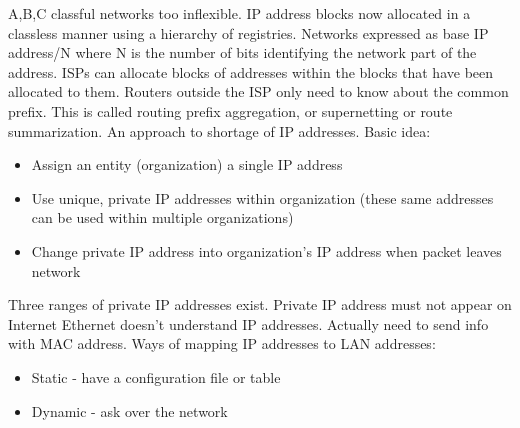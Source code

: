 \documentclass[number]{notes}
\begin{document}
\begin{landscape}
\begin{multicols}{3}
A,B,C classful networks too inflexible. IP address blocks now allocated in a classless manner using a hierarchy of registries. Networks expressed as base IP address/N where N is the number of bits identifying the network part of the address.
ISPs can allocate blocks of addresses within the blocks that have been allocated to them. Routers outside the ISP only need to know about the common prefix. This is called routing prefix aggregation, or supernetting or route summarization.
An approach to shortage of IP addresses.
Basic idea:
\begin{itemize}[nolistsep]
    \item Assign an entity (organization) a single IP address
    \item Use unique, private IP addresses within organization (these same addresses can be used within multiple organizations)
    \item Change private IP address into organization's IP address when packet leaves network
\end{itemize}
Three ranges of private IP addresses exist. Private IP address must not appear on Internet
Ethernet doesn't understand IP addresses. Actually need to send info with MAC address. Ways of mapping IP addresses to LAN addresses:
\begin{itemize}[nolistsep]
    \item Static - have a configuration file or table
    \item Dynamic - ask over the network
\end{itemize}


\end{multicols}
\end{landscape}
\end{document}
